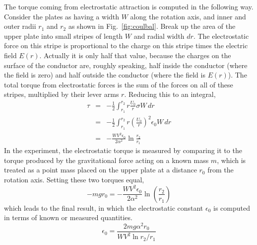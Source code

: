 \documentclass{revtex4}
\begin{document}
The torque coming from electrostatic attraction is computed in the
following way.  Consider the plates as having a width $W$ along the
rotation axis, and inner and outer radii $r_1$ and $r_2$ as shown
in Fig.~\ref{fig:coulbal}.  Break up the area of the upper plate into
small stripes of length $W$ and radial width $dr$.  The electrostatic
force on this stripe is proportional to the charge on this stripe times
the electric field $E(r)$.  Actually it is only half that value, because
the charges on the surface of the conductor are, roughly speaking, half
inside the conductor (where the field is zero) and half outside the
conductor (where the field is $E(r)$).  The total torque from electrostatic
forces is the sum of the forces on all of these stripes, multiplied by
their lever arms $r$.  Reducing this to an integral,
\begin{eqnarray}
\tau &=& -\frac{1}{2}\int_{r_1}^{r_2}{r\frac{U_0}{r}\sigma W\,dr} \nonumber\\
&=& -\frac{1}{2}\int_{r_1}^{r_2}{r\left(\frac{U_0}{r}\right)^2\epsilon_0 W\,dr} \nonumber\\
&=& -\frac{WV^2\epsilon_0}{2\alpha^2}\ln{\frac{r_2}{r_1}}
\label{eq:tauint}
\end{eqnarray}
In the experiment, the electrostatic torque is measured by comparing it
to the torque produced by the gravitational force acting on a known
mass $m$, which is treated as a point mass placed on the upper plate
at a distance $r_0$ from the rotation axis.  Setting these two torques
equal,
\begin{equation}
-mgr_0=-\frac{WV^2\epsilon_0}{2\alpha^2}\ln\left(\frac{r_2}{r_1}\right)
\end{equation}
which leads to the final result, in which the electrostatic constant
$\epsilon_0$ is computed in terms of known or measured quantities.
\begin{equation}
\epsilon_0 = \frac{2mg\alpha^2r_0}{WV^2\ln{r_2/r_1}}
\label{eq:epsilon0}
\end{equation}
\end{document}
